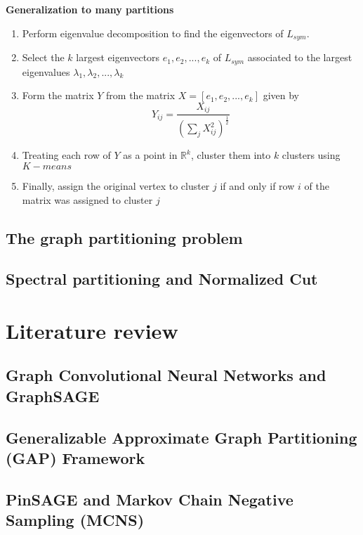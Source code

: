 \textbf{Generalization to many partitions}
\begin{enumerate}
	\item Perform eigenvalue decomposition to find the eigenvectors of $L_{sym}$.
	\item Select the $k$ largest eigenvectors $e_1, e_2, ..., e_k$ of $L_{sym}$ associated to the largest eigenvalues $\lambda_1, \lambda_2, ..., \lambda_k$
	\item Form the matrix $Y$ from the matrix $X=[e_1, e_2,..., e_k]$ given by 
	\begin{displaymath}
		Y_{ij} = \frac{X_{ij}}{\left(\sum_j X_{ij}^2\right)^\frac{1}{2}}
	\end{displaymath}
	\item Treating each row of $Y$ as a point in $\mathbb R^k$, cluster them into $k$ clusters using $K-means$
	\item Finally, assign the original vertex to cluster $j$ if and only if row $i$ of the matrix was assigned to cluster $j$
\end{enumerate}

\subsection{The graph partitioning problem}

\subsection{Spectral partitioning and Normalized Cut}

\section{Literature review}

\subsection{Graph Convolutional Neural Networks and GraphSAGE}

\subsection{Generalizable Approximate Graph Partitioning (GAP) Framework}

\subsection{PinSAGE and Markov Chain Negative Sampling (MCNS)}